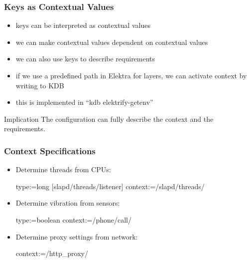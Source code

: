 \begin{frame}
	\frametitle{Keys as Contextual Values}

	\begin{itemize}[<+-| alert@+>]
	\item keys can be interpreted as contextual values~\cite{raab2016persistent,raab2017introducing}
	\item we can make contextual values dependent on contextual values
	\item we can also use keys to describe requirements
	\item if we use a predefined path in Elektra for layers, we can activate context by writing to KDB
	\item this is implemented in ``kdb elektrify-getenv''
	\end{itemize}

	\pause[\thebeamerpauses]

	\begin{alertblock}{Implication}
	The configuration can fully describe the context and the requirements.
	\end{alertblock}
\end{frame}

\begin{frame}[fragile]
	\frametitle{Context Specifications}

	\begin{itemize}
	\item
	Determine threads from CPUs:

	\begin{code}
	  type:=long
	[slapd/threads/listener]
	  context:=/slapd/threads/%
	\end{code}

	\item
	Determine vibration from sensors:

	\begin{code}
	  type:=boolean
	  context:=/phone/call/%
	\end{code}

	\item
	Determine proxy settings from network:

	\begin{code}
	  context:=/http_proxy/%
	\end{code}
	\end{itemize}
\end{frame}


